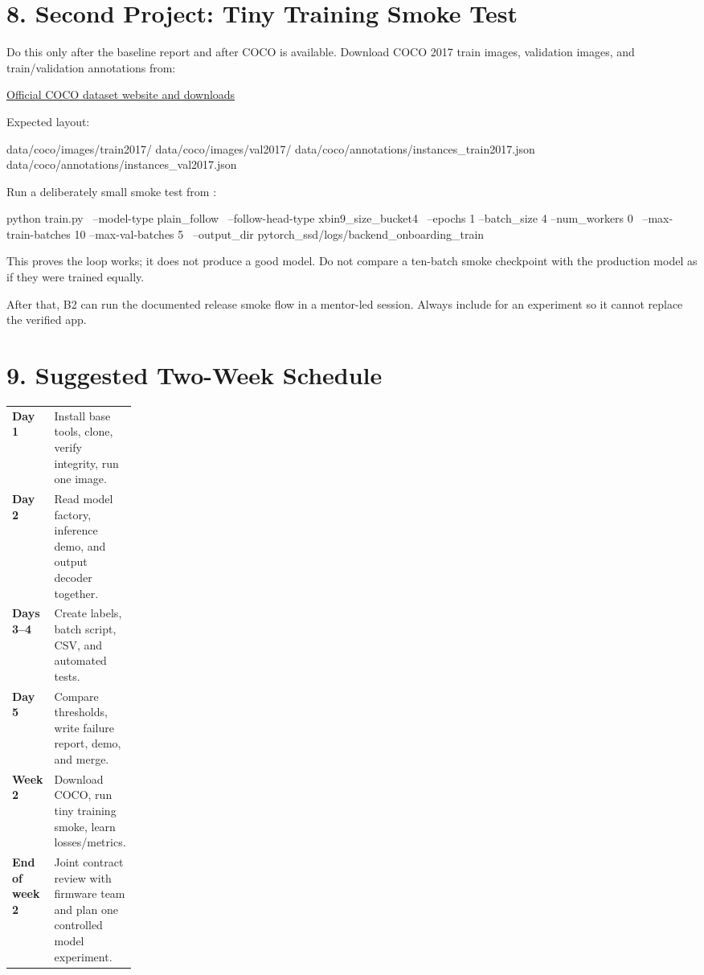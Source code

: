 \documentclass[11pt]{article}
\begin{document}
\section{8. Second Project: Tiny Training Smoke Test}

Do this only after the baseline report and after COCO is available. Download COCO 2017 train images, validation images, and train/validation annotations from:

\href{https://cocodataset.org/}{Official COCO dataset website and downloads}

Expected layout:

\begin{Code}
data/coco/images/train2017/
data/coco/images/val2017/
data/coco/annotations/instances_train2017.json
data/coco/annotations/instances_val2017.json
\end{Code}

Run a deliberately small smoke test from :

\begin{Code}
python train.py \
  --model-type plain_follow \
  --follow-head-type xbin9_size_bucket4 \
  --epochs 1 --batch_size 4 --num_workers 0 \
  --max-train-batches 10 --max-val-batches 5 \
  --output_dir pytorch_ssd/logs/backend_onboarding_train
\end{Code}

This proves the loop works; it does not produce a good model. Do not compare a ten-batch smoke checkpoint with the production model as if they were trained equally.

After that, B2 can run the documented release smoke flow in a mentor-led session. Always include  for an experiment so it cannot replace the verified app.

\section{9. Suggested Two-Week Schedule}

\begin{tabularx}{\linewidth}{>{\bfseries}p{0.18\linewidth}X}
Day 1 & Install base tools, clone, verify integrity, run one image. \\
Day 2 & Read model factory, inference demo, and output decoder together. \\
Days 3--4 & Create labels, batch script, CSV, and automated tests. \\
Day 5 & Compare thresholds, write failure report, demo, and merge. \\
Week 2 & Download COCO, run tiny training smoke, learn losses/metrics. \\
End of week 2 & Joint contract review with firmware team and plan one controlled model experiment. \\
\end{tabularx}
\end{document}
